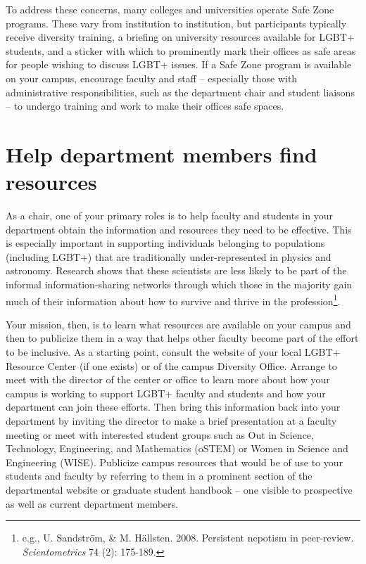 To address these concerns, many colleges and universities operate {Safe Zone} programs. These vary from institution to institution, but participants typically receive diversity training, a briefing on university resources available for LGBT+ students, and a sticker with which to prominently mark their offices as safe areas for people wishing to discuss LGBT+ issues. If a Safe Zone program is available on your campus, encourage faculty and staff -- especially those with administrative responsibilities, such as the department chair and student liaisons -- to undergo training and work to make their offices safe spaces.


\section {Help department members find resources}
\label{find-resources}
As a chair, one of your primary roles is to help faculty and students in your department obtain the information and resources they need to be effective. This is especially important in supporting individuals belonging to populations (including LGBT+) that are traditionally under-represented in physics and astronomy. Research shows that these scientists are less likely to be part of the informal information-sharing networks through which those in the majority gain much of their information about how to survive and thrive in the profession\footnote{e.g., U. Sandstr\"{o}m, \& M. H\"{a}llsten. 2008. Persistent nepotism in peer-review. \emph{Scientometrics}\/ 74 (2): 175-189.}.

Your mission, then, is to {learn what resources are available} on your campus and then to publicize them in a way that helps other faculty become part of the effort to be inclusive. As a starting point, consult the website of your local LGBT+ Resource Center (if one exists) or of the campus Diversity Office. Arrange to meet with the director of the center or office to learn more about how your campus is working to support LGBT+ faculty and students and how your department can join these efforts. Then bring this information back into your department by inviting the director to make a brief presentation at a faculty meeting or meet with interested student groups such as Out in Science, Technology, Engineering, and Mathematics (oSTEM) or Women in Science and Engineering (WISE). Publicize campus resources that would be of use to your students and faculty by referring to them in a prominent section of the departmental website or graduate student handbook -- one visible to prospective as well as current department members.



